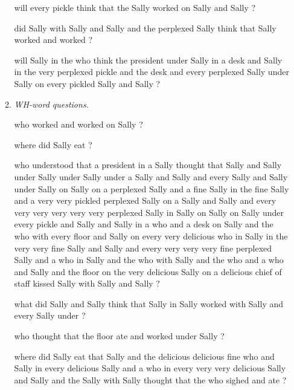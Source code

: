 \documentclass[10pt]{article}
\begin{document}
\begin{enumerate}
\begin{enumerate}
{will every pickle think that the Sally worked on Sally and Sally ?

did Sally with Sally and Sally and the perplexed Sally think that Sally worked and worked ?

will Sally in the who think the president under Sally in a desk and Sally in the very perplexed pickle and the desk and every perplexed Sally under Sally on every pickled Sally and Sally ?




}

\item {\it WH-word questions.} 

{\tt

who worked and worked on Sally ?

where did Sally eat ?

who understood that a president in a Sally thought that Sally and Sally under Sally under Sally under a Sally and Sally and every Sally and Sally under Sally on Sally on a perplexed Sally and a fine Sally in the fine Sally and a very very pickled perplexed Sally on a Sally and Sally and every very very very very very perplexed Sally in Sally on Sally on Sally under every pickle and Sally and Sally in a who and a desk on Sally and the who with every floor and Sally on every very delicious who in Sally in the very very fine Sally and Sally and every very very very fine perplexed Sally and a who in Sally and the who with Sally and the who and a who and Sally and the floor on the very delicious Sally on a delicious chief of staff kissed Sally with Sally and Sally ?


what did Sally and Sally think that Sally in Sally worked with Sally and every Sally under ?

who thought that the floor ate and worked under Sally ?

where did Sally eat that Sally and the delicious delicious fine who and Sally in every delicious Sally and a who in every very very delicious Sally and Sally and the Sally with Sally thought that the who sighed and ate ?



}

\end{enumerate}
\end{enumerate}
\end{document}
